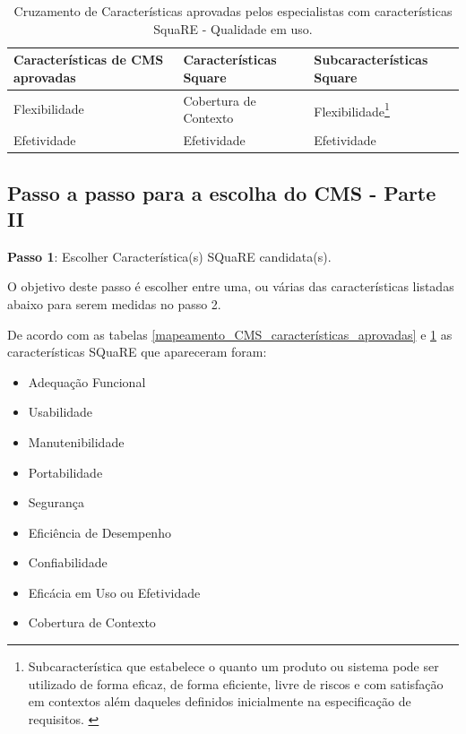 \begin{longtable}{|p{140pt}|p{140pt}|p{120pt}|}
	
	\caption{Cruzamento de Características aprovadas pelos especialistas com características SquaRE - Qualidade em uso.}
	\label{mapeamento_CMS_características_aprovadas_qualidade_em_uso}\\

 	\hline
 	 {\raggedright \textbf{Características de CMS aprovadas}}
 	 & {\raggedright \textbf{Características Square}}
 	 & {\raggedright \textbf{Subcaracterísticas Square}}\\
 	\hline
 	 {\raggedright Flexibilidade}
 	 & {\raggedright Cobertura de Contexto}
 	 & {\raggedright Flexibilidade\footnote{Subcaracterística que estabelece o quanto um produto ou sistema pode ser utilizado de forma eficaz, de forma eficiente, livre de riscos e com satisfação em contextos além daqueles definidos inicialmente na especificação de requisitos. \cite{iso_25022} }}\\
 	\hline
 	 {\raggedright Efetividade}
 	 & {\raggedright Efetividade}
 	 & {\raggedright Efetividade}\\
 	\hline
 
\end{longtable}

\subsection{Passo a passo para a escolha do CMS - Parte II}
\label{passo_parteII_metodo}

\textbf{Passo 1}: Escolher Característica(s) SQuaRE candidata(s).

O objetivo deste passo é escolher entre uma, ou várias das características listadas abaixo para serem medidas no passo 2.

De acordo com as tabelas \ref{mapeamento_CMS_características_aprovadas} e \ref{mapeamento_CMS_características_aprovadas_qualidade_em_uso} as características SQuaRE que apareceram foram:

\begin{itemize}
\item Adequação Funcional
\item Usabilidade
\item Manutenibilidade
\item Portabilidade
\item Segurança
\item Eficiência de Desempenho 
\item Confiabilidade
\item Eficácia em Uso ou Efetividade
\item Cobertura de Contexto
\end{itemize}

